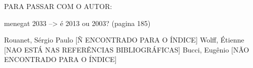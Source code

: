 PARA PASSAR COM O AUTOR:

menegat 2033 --> é 2013 ou 2003? (pagina 185)

Rouanet, Sérgio Paulo [Ñ ENCONTRADO PARA O ÍNDICE]
Wolff, Étienne [NAO ESTÁ NAS REFERÊNCIAS BIBLIOGRÁFICAS]
Bucci, Eugênio [NÃO ENCONTRADO PARA O ÍNDICE]